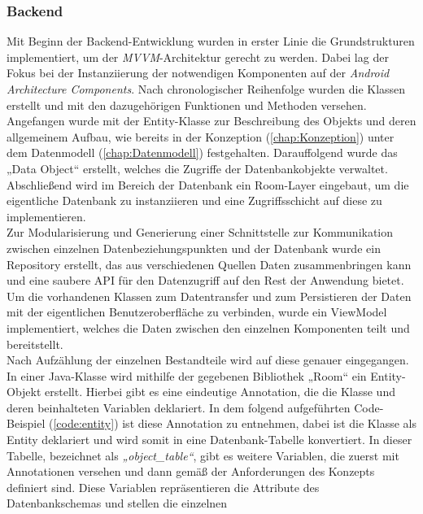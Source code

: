 \subsubsection{Backend}
Mit Beginn der Backend-Entwicklung wurden in erster Linie die Grundstrukturen implementiert, um der \textit{MVVM}-Architektur gerecht zu werden. Dabei lag 
der Fokus bei der Instanziierung der notwendigen Komponenten auf der \textit{Android Architecture Components}. Nach chronologischer Reihenfolge wurden die Klassen 
erstellt und mit den dazugehörigen Funktionen und Methoden versehen. Angefangen wurde mit der Entity-Klasse zur Beschreibung des Objekts und deren allgemeinem Aufbau, 
wie bereits in der Konzeption (\ref{chap:Konzeption}) unter dem Datenmodell (\ref{chap:Datenmodell}) festgehalten. Darauffolgend wurde das „Data Object“ 
erstellt, welches die Zugriffe der Datenbankobjekte verwaltet. Abschließend wird im Bereich der Datenbank ein Room-Layer eingebaut, um die eigentliche Datenbank zu 
instanziieren und eine Zugriffsschicht auf diese zu implementieren. 
\\ 
Zur Modularisierung und Generierung einer Schnittstelle zur Kommunikation zwischen einzelnen Datenbeziehungspunkten und der Datenbank wurde ein Repository erstellt, 
das aus verschiedenen Quellen Daten zusammenbringen kann und eine saubere \acs{API} für den Datenzugriff auf den Rest der Anwendung bietet. 
Um die vorhandenen Klassen zum Datentransfer und zum Persistieren der Daten mit der eigentlichen Benutzeroberfläche zu verbinden, wurde ein ViewModel implementiert, 
welches die Daten zwischen den einzelnen Komponenten teilt und bereitstellt. 
\\ 
\linebreak 
Nach Aufzählung der einzelnen Bestandteile wird auf diese genauer eingegangen. 
\\ 
\linebreak
In einer Java-Klasse wird mithilfe der gegebenen Bibliothek „Room“ ein Entity-Objekt erstellt. Hierbei gibt es eine eindeutige Annotation, die die Klasse und 
deren beinhalteten Variablen deklariert. In dem folgend aufgeführten Code-Beispiel (\ref{code:entity}) ist diese Annotation zu entnehmen, dabei ist die Klasse als 
Entity deklariert und wird somit in eine Datenbank-Tabelle konvertiert. 
In dieser Tabelle, bezeichnet als \textit{„object\_table“}, gibt es weitere Variablen, die zuerst mit Annotationen versehen und dann gemäß der Anforderungen des 
Konzepts definiert sind. Diese Variablen repräsentieren die Attribute des Datenbankschemas und stellen die einzelnen 
